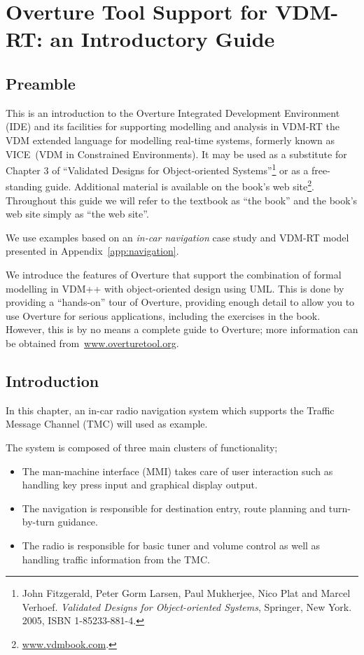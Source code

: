 \chapter{Overture Tool Support for VDM-RT: an Introductory Guide}\label{cha:toolbox}
\initexercise

\section*{Preamble}

This is an introduction to the Overture Integrated Development
Environment (IDE) and its facilities for supporting modelling and
analysis in VDM-RT the VDM extended language for modelling real-time
systems, formerly known as VICE~(VDM in Constrained Environments). It
may be used as a substitute for Chapter 3 of ``Validated Designs for
Object-oriented Systems''\footnote{John Fitzgerald, Peter Gorm Larsen,
  Paul Mukherjee, Nico Plat and Marcel Verhoef. \emph{Validated
    Designs for Object-oriented Systems}, Springer, New York. 2005,
  ISBN 1-85233-881-4.} or as a free-standing guide. Additional material
is available on the book's web
site\footnote{\url{www.vdmbook.com}.}. Throughout this guide we will refer to
the textbook as ``the book'' and the book's web site simply as ``the
web site''.

We use examples based on an \emph{in-car navigation} case study and
VDM-RT model presented in Appendix~\ref{app:navigation}. 

We introduce the features of Overture that support the combination of
formal modelling in VDM++ with object-oriented design using UML. This
is done by providing a ``hands-on'' tour of Overture, providing enough
detail to allow you to use Overture for serious applications,
including the exercises in the book. However, this is by no means a
complete guide to Overture; more information can be obtained
from~\url{www.overturetool.org}.



\section{Introduction}

In this chapter, an in-car radio navigation system which supports the Traffic Message Channel (TMC) will used as example. 

The system is composed of three main clusters of functionality; 
\begin{itemize}
\item The man-machine interface (MMI) takes care of user interaction such as handling key press input and graphical display output. 
\item The navigation is responsible for destination entry, route planning and turn-by-turn guidance. 
\item The radio is responsible for basic tuner and volume control as well as handling traffic information from the TMC.
\end{itemize}

